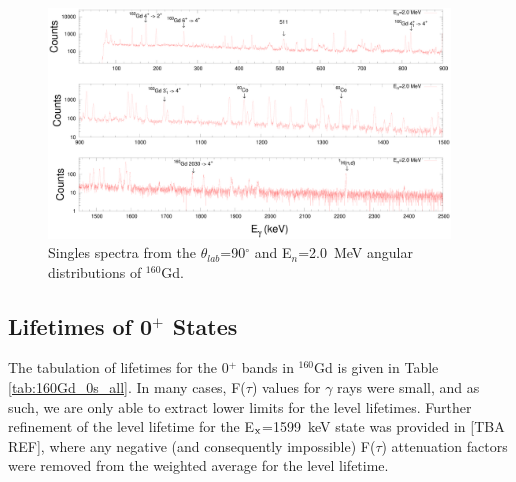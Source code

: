 \begin{figure}[h!]
\begin{center}
\includegraphics[width=0.95\textwidth]{160Gd_200_spectra.eps}
\caption{Singles spectra from the $\theta_{lab}$=90$^\circ$ and E$_n$=2.0~MeV angular distributions of $^{160}$Gd. \label{fig:160Gd_200_spectrum}}
\end{center}
\end{figure}

\subsection{Lifetimes of 0$^+$ States}
The tabulation of lifetimes for the 0$^+$ bands in $^{160}$Gd is given in Table \ref{tab:160Gd_0s_all}. In many cases, F($\tau$) values for $\gamma$ rays were small, and as such, we are only able to extract lower limits for the level lifetimes. Further refinement of the level lifetime for the E$_{\rm x}$=1599~keV state was provided in [TBA REF], where any negative (and consequently impossible) F($\tau$) attenuation factors were removed from the weighted average for the level lifetime.

